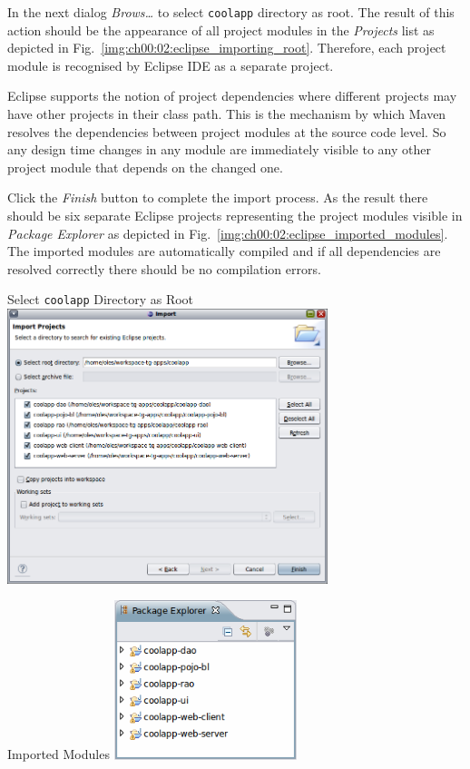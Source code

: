  In the next dialog \emph{Brows\ldots} to select \texttt{coolapp} directory as root.
  The result of this action should be the appearance of all project modules in the \emph{Projects} list as depicted in Fig.~\ref{img:ch00:02:eclipse_importing_root}.  
  Therefore, each project module is recognised by Eclipse IDE as a separate project.
  
  Eclipse supports the notion of project dependencies where different projects may have other projects in their class path.
  This is the mechanism by which Maven resolves the dependencies between project modules at the source code level.
  So any design time changes in any module are immediately visible to any other project module that depends on the changed one.

  Click the \emph{Finish} button to complete the import process.
  As the result there should be six separate Eclipse projects representing the project modules visible in \emph{Package Explorer} as depicted in Fig.~\ref{img:ch00:02:eclipse_imported_modules}.
  The imported modules are automatically compiled and if all dependencies are resolved correctly there should be no compilation errors.

  \begin{image}{Select \texttt{coolapp} Directory as Root}{\label{img:ch00:02:eclipse_importing_root}}    
    \includegraphics[width=0.7\textwidth]{parts/00-part/chapters/01-application-modules/images/10-eclipse-importing.png}
  \end{image}
 
  \begin{image}{Imported Modules}{\label{img:ch00:02:eclipse_imported_modules}}    
    \includegraphics[width=0.4\textwidth]{parts/00-part/chapters/01-application-modules/images/11-eclipse-imported-modules.png}
  \end{image}  
 


